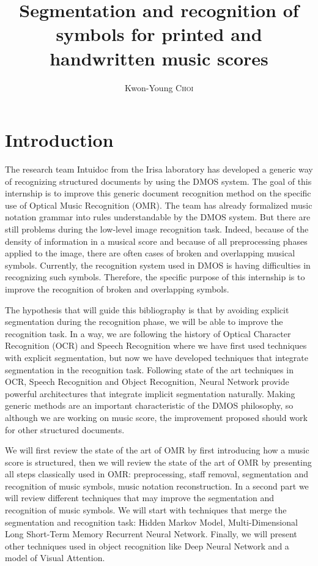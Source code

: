 \documentclass[11pt]{sdm}
\title{Segmentation and recognition of symbols for printed and handwritten music scores}
\author{Kwon-Young \textsc{Choi}}
\begin{document}
\maketitle


\section{Introduction}

The research team Intuidoc from the Irisa laboratory has developed a generic way of recognizing structured documents by using the DMOS system.
The goal of this internship is to improve this generic document recognition method on the specific use of Optical Music Recognition (OMR).
The team has already formalized music notation grammar into rules understandable by the DMOS system.
But there are still problems during the low-level image recognition task.
Indeed, because of the density of information in a musical score and because of all preprocessing phases applied to the image, there are often cases of broken and overlapping musical symbols.
Currently, the recognition system used in DMOS is having difficulties in recognizing such symbols.
Therefore, the specific purpose of this internship is to improve the recognition of broken and overlapping symbols.

The hypothesis that will guide this bibliography is that by avoiding explicit segmentation during the recognition phase, we will be able to improve the recognition task.
In a way, we are following the history of Optical Character Recognition (OCR) and Speech Recognition where we have first used techniques with explicit segmentation, but now we have developed techniques that integrate segmentation in the recognition task.
Following state of the art techniques in OCR, Speech Recognition and Object Recognition, Neural Network provide powerful architectures that integrate implicit segmentation naturally.
Making generic methods are an important characteristic of the DMOS philosophy, so although we are working on music score, the improvement proposed should work for other structured documents.

We will first review the state of the art of OMR by first introducing how a music score is structured, then we will review the state of the art of OMR by presenting all steps classically used in OMR: preprocessing, staff removal, segmentation and recognition of music symbols, music notation reconstruction.
In a second part we will review different techniques that may improve the segmentation and recognition of music symbols.
We will start with techniques that merge the segmentation and recognition task: Hidden Markov Model, Multi-Dimensional Long Short-Term Memory Recurrent Neural Network.
Finally, we will present other techniques used in object recognition like Deep Neural Network and a model of Visual Attention.
\end{document}
